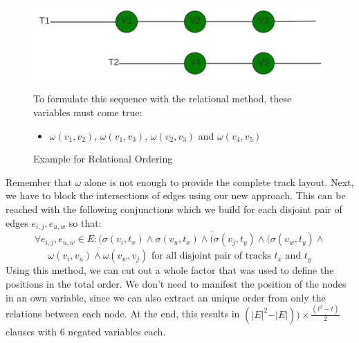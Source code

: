 \documentclass[bachelor, english]{algothesis}
\begin{document}
\begin{figure}[ht]
  \centering
  \begin{minipage}{0.6\textwidth}
    \includegraphics[width=\linewidth]{figures/Order_example.png}
  \caption{Example for Relational Ordering}
  \label{fig:order_example_rel}
  \end{minipage}%
  \begin{minipage}{0.4\textwidth}
    To formulate this sequence with the relational method, these variables must come true:
    \begin{itemize}
    \item  $\omega(v_1,v_2)$, $\omega(v_1,v_3)$, $\omega(v_2,v_3)$ and $\omega(v_4,v_5)$
    \end{itemize}
  \end{minipage}
\end{figure}
\noindent
Remember that $\omega$ alone is not enough to provide the complete track layout. Next, we have to block the intersections of edges using our new approach. This can be reached with the following conjunctions which we build for each disjoint pair of edges $e_{i,j}, e_{u,w}$ so that:
    $$ \forall e_{i,j}, e_{u,w} \in E : \overline{(\sigma(v_i,t_x) \land \sigma(v_u,t_x) \land (\sigma(v_j,t_y) \land (\sigma(v_w,t_y) \land}$$
    $$ \overline{\omega(v_i,v_u) \land \omega(v_w,v_j)}\text{ for all disjoint pair of tracks } t_x \text{ and } t_y $$
Using this method, we can cut out a whole factor that was used to define the positions in the total order. We don't need to manifest the position of the nodes in an own variable, since we can also extract an unique order from only the relations between each node. At the end, this results in
$ (\vert E \vert^2 - \vert E \vert)) \times \frac{(t^2-t)}{2}$ clauses with 6 negated variables each.
\end{document}
